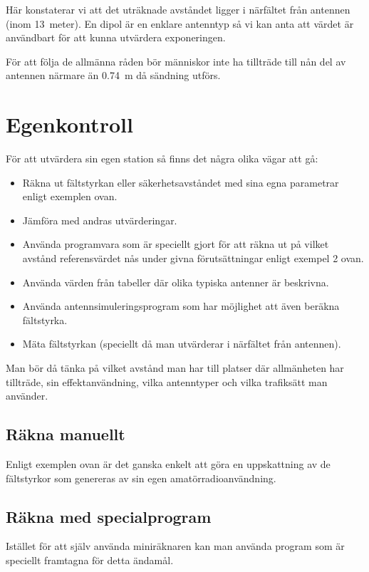 Här konstaterar vi att det uträknade avståndet ligger i närfältet från antennen
(inom 13~meter).
En dipol är en enklare antenntyp så vi kan anta att värdet är användbart för att
kunna utvärdera exponeringen.

För att följa de allmänna råden bör människor inte ha tillträde till nån del av
antennen närmare än \qty{0,74}{\metre} då sändning utförs.

\section{Egenkontroll}

För att utvärdera sin egen station så finns det några olika vägar att gå:

\begin{itemize}
\item Räkna ut fältstyrkan eller säkerhetsavståndet med sina egna
  parametrar enligt exemplen ovan.
\item Jämföra med andras utvärderingar.
\item Använda programvara som är speciellt gjort för att räkna ut på
  vilket avstånd referensvärdet nås under givna förutsättningar enligt
  exempel 2 ovan.
\item Använda värden från tabeller där olika typiska antenner är beskrivna.
\item Använda antennsimuleringsprogram som har möjlighet att även
  beräkna fältstyrka.
\item Mäta fältstyrkan (speciellt då man utvärderar i närfältet från
  antennen).
\end{itemize}

Man bör då tänka på vilket avstånd man har till platser där allmänheten har
tillträde, sin effektanvändning, vilka antenntyper och vilka trafiksätt man
använder.

\subsection{Räkna manuellt}

Enligt exemplen ovan är det ganska enkelt att göra en uppskattning av
de fältstyrkor som genereras av sin egen amatörradioanvändning.

\subsection{Räkna med specialprogram}

Istället för att själv använda miniräknaren kan man använda program
som är speciellt framtagna för detta ändamål.


